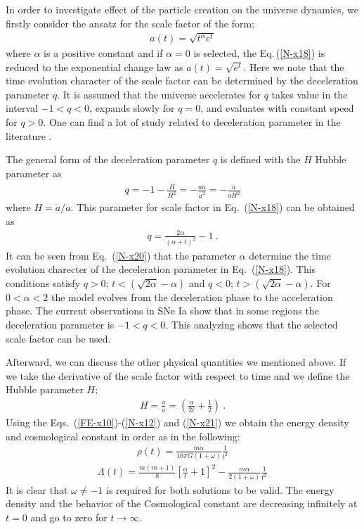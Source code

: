 \documentclass[superscriptaddress,showpacs,pre,twocolumn]{revtex4-1}
\begin{document}
In order to investigate effect of the particle creation on the universe dynamics, we firstly consider the ansatz for the scale factor of the form;
\begin{eqnarray} \label{N-x18}
a(t) = \sqrt{t^{\alpha}e^{t}}
\end{eqnarray}
where $\alpha$ is a positive constant and if $\alpha = 0$ is selected, the Eq.\,(\ref{N-x18}) is reduced to the exponential change law as $a(t)=\sqrt{e^{t}}$. Here we note that the time evolution character of the scale factor can be determined by the deceleration parameter $q$. It is assumed that the universe accelerates for $q$ takes value in the interval $-1<q<0$, expands slowly for $q=0$, and  evaluates with constant speed for $q>0$. One can find a lot of study related to deceleration parameter in the literature \cite{Perlmutter1998,Perlmutter1999,Riess1998,Schuecker1998,Mak2002,Ahmed2014,Akarsu2012,Amirhashchi2011,Pradhan2006,Pradhan2007,Pradhan2014a,Saha2012}. 

The general form of the deceleration parameter $q$ is defined with the $H$ Hubble parameter as
\begin{eqnarray} \label{N-x19}
q=-1-\frac{\dot{H}}{H^{2}} = -\frac{a \ddot{a}}{\dot{a}^{2}} = - \frac{\ddot{a}}{aH^{2}} 
\end{eqnarray}
where $H=\dot{a}/a$. This parameter for scale factor in Eq.~(\ref{N-x18}) can be obtained as
\begin{eqnarray} \label{N-x20}
q=\frac{2\alpha}{(\alpha +t)^{2}}-1  \ .
\end{eqnarray}
It can be seen from Eq.~(\ref{N-x20}) that the parameter $\alpha$ determine the time evolution charecter of the deceleration parameter in Eq.~(\ref{N-x18}). This conditions satisfy  $q>0$; $t<(\sqrt{2\alpha}-\alpha)$ and $q<0$; $t>(\sqrt{2\alpha}-\alpha)$. For $0<\alpha<2$ the 
model evolves from the deceleration phase to the acceleration phase.
The current observations in SNe Ia show that in some regions the deceleration parameter is $-1<q<0$. This analyzing shows that the selected scale factor can be used.

Afterward, we can discuss the other physical quantities we mentioned above. If we take the derivative of the scale factor with respect to time and we define the Hubble parameter $H$;
\begin{eqnarray} \label{N-x21}
H=\frac{\dot{a}}{a}=\left(\frac{\alpha}{2t}+\frac{1}{2}\right) \ .
\end{eqnarray}
Using the Eqs.~(\ref{FE-x10})-(\ref{N-x12}) and (\ref{N-x21}) we obtain the energy density and cosmological constant in order as in the following:
\begin{eqnarray} \label{N-x22}
\rho(t) = \frac{m\alpha}{16\pi G(1+\omega)} \frac{1}{t^{2}}
\end{eqnarray}
\begin{eqnarray} \label{N-x23}
\Lambda(t) = \frac{m(m+1)}{8} \left[ \frac{\alpha}{t} + 1  \right]^{2} - \frac{m \alpha}{2(1+\omega)} \frac{1}{ t^{2}}
\end{eqnarray}
It is clear that $\omega \ne -1$ is required for both solutions to be valid. The energy density and the behavior of the Cosmological constant are decreasing infinitely at $t = 0$ and go to zero for $t \rightarrow \infty$. 
\end{document}
